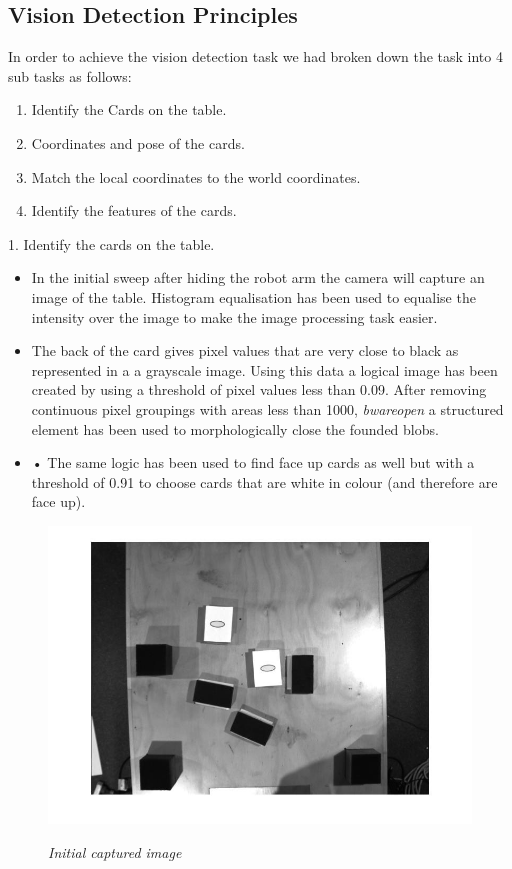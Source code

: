 \subsection{Vision Detection Principles}
In order to achieve the vision detection task we had broken down the task into 4 sub tasks as follows:
\begin{enumerate}
	\item Identify the Cards on the table.
	\item Coordinates and pose of the cards.
	\item Match the local coordinates to the world coordinates.
	\item Identify the features of the cards.
\end{enumerate}


1.	Identify the cards on the table.
\begin{itemize}
	\item In the initial sweep after hiding the robot arm the camera will capture an image of the table. Histogram equalisation has been used to equalise the intensity over the image to make the image processing task easier. 
	\item The back of the card gives pixel values that are very close to black as represented in a a grayscale image. Using this data a logical image has been created by using a threshold of pixel values less than 0.09. After removing continuous pixel groupings with areas less than 1000, \emph{bwareopen} a structured element has been used to morphologically close the founded blobs.
	\item •	The same logic has been used to find face up cards as well but with a threshold of 0.91 to choose cards that are white in colour (and therefore are face up).
\end{itemize}

\begin{figure}[position = here]
	\begin{centering}
		\includegraphics[scale=0.3]{./sachiths_images/image3.png}\\
		\caption[]{\textit{Initial captured image}}
	\end{centering}
\end{figure}

